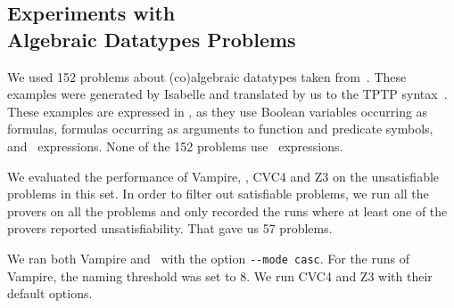 %
%

\subsection[Experiments with Algebraic Datatypes Problems]{Experiments with\\Algebraic Datatypes Problems}\label{subsec:ADT}
We used 152 problems about (co)algebraic datatypes taken from~\cite{Blanchette15}. 
These examples were generated by Isabelle and translated by us to the TPTP syntax~\cite{TPTP}. 
These examples are expressed in \folb{}, as they use Boolean variables occurring as formulas, formulas occurring as arguments to function and predicate symbols, and \ITE\ expressions. None of the 152 problems use \LETIN\ expressions.

We evaluated the performance of Vampire, \oldcnfVampire,
CVC4 and Z3 on the unsatisfiable problems in this set. In order to filter out satisfiable problems, we run all the provers on all the problems 
and only recorded the runs where at least one of the provers reported unsatisfiability. That gave us 57 problems.

We ran both Vampire and \oldcnfVampire\ with the option \verb'--mode casc'. For the runs of Vampire, the naming threshold was set to 8. We run CVC4 and Z3 with their default options.

